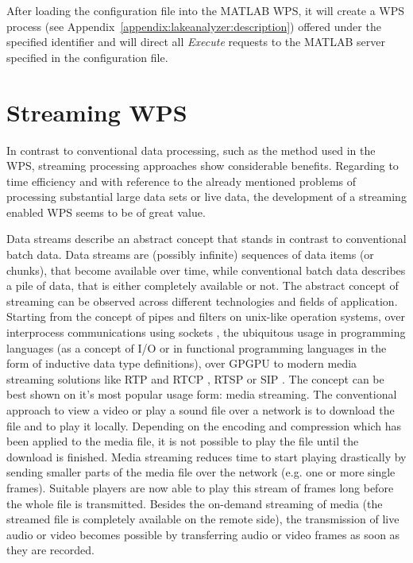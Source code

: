 		After loading the configuration file into the MATLAB WPS, it will create a WPS process (see Appendix~\ref{appendix:lakeanalyzer:description}) offered under the specified identifier and will direct all \emph{Execute} requests to the MATLAB server specified in the configuration file.

\chapter{Streaming WPS}
	In contrast to conventional data processing, such as the method used in the \ac{WPS}, streaming processing approaches show considerable benefits. Regarding to time efficiency and with reference to the already mentioned problems of processing substantial large data sets or live data, the development of a streaming enabled \ac{WPS} seems to be of great value.

	Data streams describe an abstract concept that stands in contrast to conventional batch data. Data streams are (possibly infinite) sequences of data items (or chunks), that become available over time, while conventional batch data describes a pile of data, that is either completely available or not. The abstract concept of streaming can be observed across different technologies and fields of application. Starting from the concept of pipes and filters on unix-like operation systems, over interprocess communications using sockets \citep[either local or over a network,][]{buschmann1996pattern}, the ubiquitous usage in programming languages (as a concept of I/O or in functional programming languages in the form of inductive data type definitions), over \ac{GPGPU} to modern media streaming solutions like RTP and RTCP \citep{ietf:rfc3550}, RTSP \citep{ietf:rfc2326} or SIP \citep{ietf:rfc3261}.
	The concept can be best shown on it's most popular usage form: media streaming. The conventional approach to view a video or play a sound file over a network is to download the file and to play it locally. Depending on the encoding and compression which has been applied to the media file, it is not possible to play the file until the download is finished. Media streaming reduces time to start playing drastically by sending smaller parts of the media file over the network (e.g. one or more single frames). Suitable players are now able to play this stream of frames long before the whole file is transmitted. Besides the on-demand streaming of media (the streamed file is completely available on the remote side), the transmission of live audio or video becomes possible by transferring audio or video frames as soon as they are recorded.

